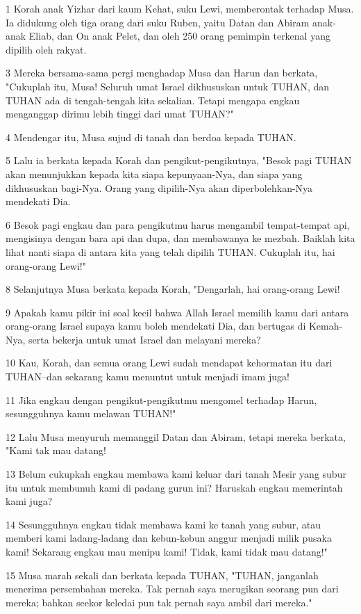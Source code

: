 \par 1 Korah anak Yizhar dari kaum Kehat, suku Lewi, memberontak terhadap Musa. Ia didukung oleh tiga orang dari suku Ruben, yaitu Datan dan Abiram anak-anak Eliab, dan On anak Pelet, dan oleh 250 orang pemimpin terkenal yang dipilih oleh rakyat.
\par 3 Mereka bersama-sama pergi menghadap Musa dan Harun dan berkata, "Cukuplah itu, Musa! Seluruh umat Israel dikhususkan untuk TUHAN, dan TUHAN ada di tengah-tengah kita sekalian. Tetapi mengapa engkau menganggap dirimu lebih tinggi dari umat TUHAN?"
\par 4 Mendengar itu, Musa sujud di tanah dan berdoa kepada TUHAN.
\par 5 Lalu ia berkata kepada Korah dan pengikut-pengikutnya, "Besok pagi TUHAN akan menunjukkan kepada kita siapa kepunyaan-Nya, dan siapa yang dikhususkan bagi-Nya. Orang yang dipilih-Nya akan diperbolehkan-Nya mendekati Dia.
\par 6 Besok pagi engkau dan para pengikutmu harus mengambil tempat-tempat api, mengisinya dengan bara api dan dupa, dan membawanya ke mezbah. Baiklah kita lihat nanti siapa di antara kita yang telah dipilih TUHAN. Cukuplah itu, hai orang-orang Lewi!"
\par 8 Selanjutnya Musa berkata kepada Korah, "Dengarlah, hai orang-orang Lewi!
\par 9 Apakah kamu pikir ini soal kecil bahwa Allah Israel memilih kamu dari antara orang-orang Israel supaya kamu boleh mendekati Dia, dan bertugas di Kemah-Nya, serta bekerja untuk umat Israel dan melayani mereka?
\par 10 Kau, Korah, dan semua orang Lewi sudah mendapat kehormatan itu dari TUHAN--dan sekarang kamu menuntut untuk menjadi imam juga!
\par 11 Jika engkau dengan pengikut-pengikutmu mengomel terhadap Harun, sesungguhnya kamu melawan TUHAN!"
\par 12 Lalu Musa menyuruh memanggil Datan dan Abiram, tetapi mereka berkata, "Kami tak mau datang!
\par 13 Belum cukupkah engkau membawa kami keluar dari tanah Mesir yang subur itu untuk membunuh kami di padang gurun ini? Haruskah engkau memerintah kami juga?
\par 14 Sesungguhnya engkau tidak membawa kami ke tanah yang subur, atau memberi kami ladang-ladang dan kebun-kebun anggur menjadi milik pusaka kami! Sekarang engkau mau menipu kami! Tidak, kami tidak mau datang!"
\par 15 Musa marah sekali dan berkata kepada TUHAN, "TUHAN, janganlah menerima persembahan mereka. Tak pernah saya merugikan seorang pun dari mereka; bahkan seekor keledai pun tak pernah saya ambil dari mereka."

